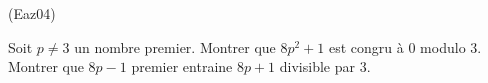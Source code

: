 \begin{tiny}(Eaz04)\end{tiny} Soit $p\neq 3$ un nombre premier. \newline
Montrer que $8p^{2}+1$ est congru à $0$ modulo $3$. Montrer que $8p-1$ premier entraine $8p+1$ divisible par $3$. 